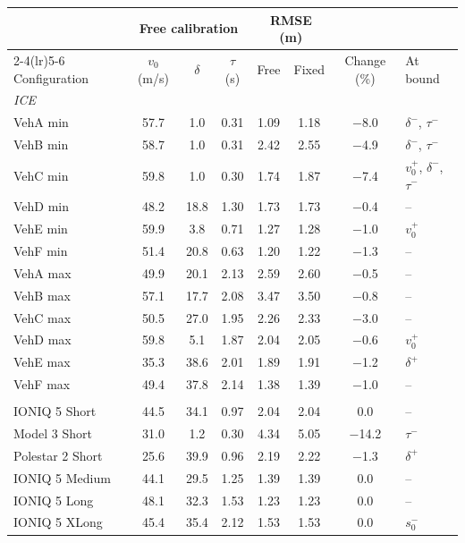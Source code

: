 \begin{tabular}{lccccccl}
\toprule
 & \multicolumn{3}{c}{Free calibration} & \multicolumn{2}{c}{RMSE (m)} & & \\
\cmidrule(lr){2-4}\cmidrule(lr){5-6}
Configuration & $v_0$ (m/s) & $\delta$ & $\tau$ (s) & Free & Fixed & Change (\%) & At bound \\
\midrule
\multicolumn{8}{l}{\textit{ICE}} \\
\quad VehA min & 57.7 & 1.0 & 0.31 & 1.09 & 1.18 & $-$8.0 & $\delta^{-}$, $\tau^{-}$ \\
\quad VehB min & 58.7 & 1.0 & 0.31 & 2.42 & 2.55 & $-$4.9 & $\delta^{-}$, $\tau^{-}$ \\
\quad VehC min & 59.8 & 1.0 & 0.30 & 1.74 & 1.87 & $-$7.4 & $v_0^{+}$, $\delta^{-}$, $\tau^{-}$ \\
\quad VehD min & 48.2 & 18.8 & 1.30 & 1.73 & 1.73 & $-$0.4 & -- \\
\quad VehE min & 59.9 & 3.8 & 0.71 & 1.27 & 1.28 & $-$1.0 & $v_0^{+}$ \\
\quad VehF min & 51.4 & 20.8 & 0.63 & 1.20 & 1.22 & $-$1.3 & -- \\
\quad VehA max & 49.9 & 20.1 & 2.13 & 2.59 & 2.60 & $-$0.5 & -- \\
\quad VehB max & 57.1 & 17.7 & 2.08 & 3.47 & 3.50 & $-$0.8 & -- \\
\quad VehC max & 50.5 & 27.0 & 1.95 & 2.26 & 2.33 & $-$3.0 & -- \\
\quad VehD max & 59.8 & 5.1 & 1.87 & 2.04 & 2.05 & $-$0.6 & $v_0^{+}$ \\
\quad VehE max & 35.3 & 38.6 & 2.01 & 1.89 & 1.91 & $-$1.2 & $\delta^{+}$ \\
\quad VehF max & 49.4 & 37.8 & 2.14 & 1.38 & 1.39 & $-$1.0 & -- \\
\addlinespace
\multicolumn{8}{l}{\textit{EV}} \\
\quad IONIQ 5 Short & 44.5 & 34.1 & 0.97 & 2.04 & 2.04 & 0.0 & -- \\
\quad Model 3 Short & 31.0 & 1.2 & 0.30 & 4.34 & 5.05 & $-$14.2 & $\tau^{-}$ \\
\quad Polestar 2 Short & 25.6 & 39.9 & 0.96 & 2.19 & 2.22 & $-$1.3 & $\delta^{+}$ \\
\quad IONIQ 5 Medium & 44.1 & 29.5 & 1.25 & 1.39 & 1.39 & 0.0 & -- \\
\quad IONIQ 5 Long & 48.1 & 32.3 & 1.53 & 1.23 & 1.23 & 0.0 & -- \\
\quad IONIQ 5 XLong & 45.4 & 35.4 & 2.12 & 1.53 & 1.53 & 0.0 & $s_0^{-}$ \\
\bottomrule
\end{tabular}
